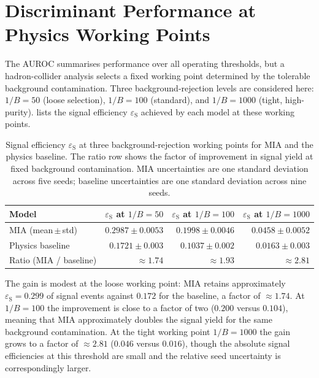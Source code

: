 \section{Discriminant Performance at Physics Working Points}
\label{sec:ch9_discriminant}

The AUROC summarises performance over all operating thresholds, but a hadron-collider
analysis selects a fixed working point determined by the tolerable background
contamination. Three background-rejection levels are considered here:
$1/B = 50$ (loose selection), $1/B = 100$ (standard), and $1/B = 1000$
(tight, high-purity).  lists the signal efficiency
$\varepsilon_{\mathrm{S}}$ achieved by each model at these working points.

\begin{table}[h]
\centering\small
\begin{tabular}{lrrr}
\toprule
Model & $\varepsilon_{\mathrm{S}}$ at $1/B=50$ & $\varepsilon_{\mathrm{S}}$ at $1/B=100$ & $\varepsilon_{\mathrm{S}}$ at $1/B=1000$ \\
\midrule
MIA (mean\,$\pm$\,std) & $\num{0.2987} \pm \num{0.0053}$ & $\num{0.1998} \pm \num{0.0046}$ & $\num{0.0458} \pm \num{0.0052}$ \\
Physics baseline       & $\num{0.1721} \pm \num{0.003}$  & $\num{0.1037} \pm \num{0.002}$  & $\num{0.0163} \pm \num{0.003}$  \\
\midrule
Ratio (MIA / baseline) & $\approx 1.74$ & $\approx 1.93$ & $\approx 2.81$ \\
\bottomrule
\end{tabular}
\caption{Signal efficiency $\varepsilon_{\mathrm{S}}$ at three background-rejection
  working points for MIA and the physics baseline.
  The ratio row shows the factor of improvement in signal yield at fixed background
  contamination. MIA uncertainties are one standard deviation across five seeds;
  baseline uncertainties are one standard deviation across nine seeds.}
\label{tab:ch9_wp_comparison}
\end{table}

The gain is modest at the loose working point: MIA retains approximately
$\varepsilon_{\mathrm{S}} = \num{0.299}$ of signal events against $\num{0.172}$
for the baseline, a factor of $\approx 1.74$. At $1/B = 100$ the improvement is
close to a factor of two ($\num{0.200}$ versus $\num{0.104}$), meaning that MIA
approximately doubles the signal yield for the same background contamination.
At the tight working point $1/B = 1000$ the gain grows to a factor of
$\approx 2.81$ ($\num{0.046}$ versus $\num{0.016}$), though the absolute signal
efficiencies at this threshold are small and the relative seed uncertainty is
correspondingly larger.

